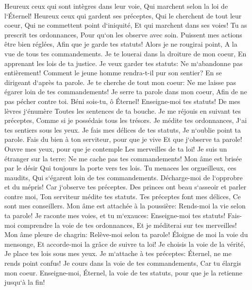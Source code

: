 \verse Heureux ceux qui sont intègres dans leur voie, Qui marchent selon la loi de l`Éternel! 
\verse Heureux ceux qui gardent ses préceptes, Qui le cherchent de tout leur coeur, 
\verse Qui ne commettent point d`iniquité, Et qui marchent dans ses voies! 
\verse Tu as prescrit tes ordonnances, Pour qu`on les observe avec soin. 
\verse Puissent mes actions être bien réglées, Afin que je garde tes statuts! 
\verse Alors je ne rougirai point, A la vue de tous tes commandements. 
\verse Je te louerai dans la droiture de mon coeur, En apprenant les lois de ta justice. 
\verse Je veux garder tes statuts: Ne m`abandonne pas entièrement! 
\verse Comment le jeune homme rendra-t-il pur son sentier? En se dirigeant d`après ta parole. 
\verse Je te cherche de tout mon coeur: Ne me laisse pas égarer loin de tes commandements! 
\verse Je serre ta parole dans mon coeur, Afin de ne pas pécher contre toi. 
\verse Béni sois-tu, ô Éternel! Enseigne-moi tes statuts! 
\verse De mes lèvres j`énumère Toutes les sentences de ta bouche. 
\verse Je me réjouis en suivant tes préceptes, Comme si je possédais tous les trésors. 
\verse Je médite tes ordonnances, J`ai tes sentiers sous les yeux. 
\verse Je fais mes délices de tes statuts, Je n`oublie point ta parole. 
\verse Fais du bien à ton serviteur, pour que je vive Et que j`observe ta parole! 
\verse Ouvre mes yeux, pour que je contemple Les merveilles de ta loi! 
\verse Je suis un étranger sur la terre: Ne me cache pas tes commandements! 
\verse Mon âme est brisée par le désir Qui toujours la porte vers tes lois. 
\verse Tu menaces les orgueilleux, ces maudits, Qui s`égarent loin de tes commandements. 
\verse Décharge-moi de l`opprobre et du mépris! Car j`observe tes préceptes. 
\verse Des princes ont beau s`asseoir et parler contre moi, Ton serviteur médite tes statuts. 
\verse Tes préceptes font mes délices, Ce sont mes conseillers. 
\verse Mon âme est attachée à la poussière: Rends-moi la vie selon ta parole! 
\verse Je raconte mes voies, et tu m`exauces: Enseigne-moi tes statuts! 
\verse Fais-moi comprendre la voie de tes ordonnances, Et je méditerai sur tes merveilles! 
\verse Mon âme pleure de chagrin: Relève-moi selon ta parole! 
\verse Éloigne de moi la voie du mensonge, Et accorde-moi la grâce de suivre ta loi! 
\verse Je choisis la voie de la vérité, Je place tes lois sous mes yeux. 
\verse Je m`attache à tes préceptes: Éternel, ne me rends point confus! 
\verse Je cours dans la voie de tes commandements, Car tu élargis mon coeur. 
\verse Enseigne-moi, Éternel, la voie de tes statuts, pour que je la retienne jusqu`à la fin! 
